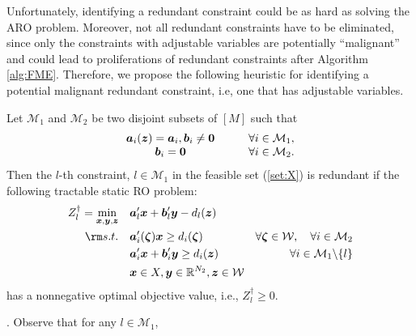\documentclass[fleqn,mnsc,blindrev]{informs4}
\newcommand{\mb}[1]{\mbox{\boldmath \ensuremath{#1}}}
\renewcommand{\Re}{\mathbb{R}}
\begin{document}
		
		Unfortunately, identifying a redundant constraint could be as hard as solving the ARO problem.  Moreover, not all redundant constraints have to be eliminated,  since only the constraints with adjustable variables are potentially ``malignant''  and could lead to proliferations of redundant constraints after  Algorithm \ref{alg:FME}. Therefore, we propose the following heuristic for identifying a potential malignant redundant constraint, i.e, one that has adjustable variables.
		\begin{theorem} \label{thm:RCI}
     	Let $\mathcal{M}_1$ and $\mathcal{M}_2$  be two  disjoint subsets of $[M]$ such that 
\begin{equation*}
			\begin{array}{cl}
			\mb{a}_i(\mb{z}) = \mb{a}_i,  \mb{b}_i \neq \mb{0} &\qquad \forall i \in \mathcal{M}_1,\\
			\mb{b}_i = \mb{0} & \qquad \forall i \in \mathcal{M}_2.
			\end{array}
\end{equation*}
			Then the $l$-th constraint, $l \in \mathcal{M}_1$  in the feasible set (\ref{set:X}) is redundant if  the following tractable static RO problem:
\begin{equation} \label{mol:RCI}
				\begin{aligned} 
					Z^\dag_l =	\min_{ \boldsymbol{x} , \boldsymbol{y}, \boldsymbol{z}} \quad & \mb{a}'_l\mb{x}+\mb{b}'_l \mb{y} - d_l(\mb{z})  \\
					{\rm s.t.}  \quad &  \mb{a}'_i(\mb{\zeta})\mb{x} \geq d_i(\mb{\zeta}) &  \forall  \mb{\zeta} \in  \mathcal{W}, \quad \forall i  \in \mathcal{M}_2  \\
					\quad & \mb{a}'_i\mb{x}+\mb{b}'_i \mb{y} \geq d_i(\mb{z})  &  \forall i  \in \mathcal{M}_1 \backslash \{l\} \\
					\quad & \mb{x} \in X , \mb{y} \in \Re^{N_2}, \mb{z} \in \mathcal{W}
				\end{aligned}
\end{equation}
			has a nonnegative optimal objective value, i.e., $ Z^\dag_l\ge 0$.	
		\end{theorem}
		. 
		Observe that for  any $l \in \mathcal{M}_1$,
\end{document}
